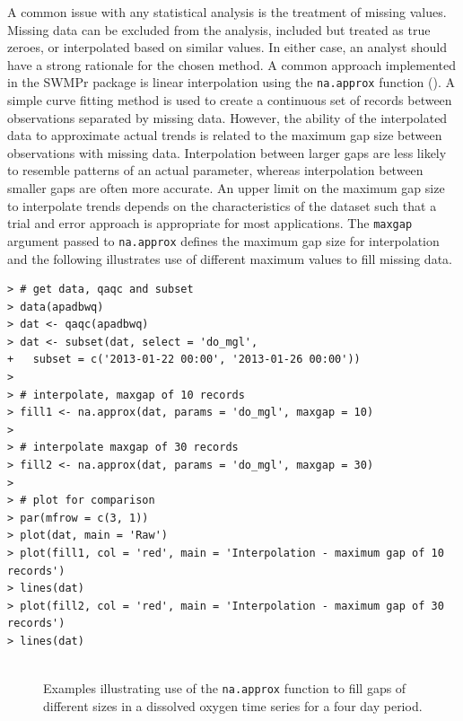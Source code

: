 \documentclass[10pt,letterpaper]{article}\usepackage[]{graphicx}\usepackage[]{color}
\makeatletter
\newenvironment{kframe}{%
 \def\at@end@of@kframe{}%
 \ifinner\ifhmode%
  \def\at@end@of@kframe{\end{minipage}}%
  \begin{minipage}{\columnwidth}%
 \fi\fi%
 \def\FrameCommand##1{\hskip\@totalleftmargin \hskip-\fboxsep
 \colorbox{shadecolor}{##1}\hskip-\fboxsep
     \hskip-\linewidth \hskip-\@totalleftmargin \hskip\columnwidth}%
 \MakeFramed {\advance\hsize-\width
   \@totalleftmargin\z@ \linewidth\hsize
   \@setminipage}}%
 {\par\unskip\endMakeFramed%
 \at@end@of@kframe}
\newenvironment{knitrout}{}{} %
\makeatother
\begin{document}
A common issue with any statistical analysis is the treatment of missing values.  Missing data can be excluded from the analysis, included but treated as true zeroes, or interpolated based on similar values.  In either case, an analyst should have a strong rationale for the chosen method.  A common approach implemented in the SWMPr package is linear interpolation using the \texttt{na.approx} function ().  A simple curve fitting method is used to create a continuous set of records between observations separated by missing data.  However, the ability of the interpolated data to approximate actual trends is related to the maximum gap size between observations with missing data.  Interpolation between larger gaps are less likely to resemble patterns of an actual parameter, whereas interpolation between smaller gaps are often more accurate.  An upper limit on the maximum gap size to interpolate trends depends on the characteristics of the dataset such that a trial and error approach is appropriate for most applications.  The \texttt{maxgap} argument passed to \texttt{na.approx} defines the maximum gap size for interpolation and the following illustrates use of different maximum values to fill missing data.  

\begin{knitrout}\small
{}\color{fgcolor}\begin{kframe}
\begin{verbatim}
> # get data, qaqc and subset
> data(apadbwq)
> dat <- qaqc(apadbwq)
> dat <- subset(dat, select = 'do_mgl', 
+   subset = c('2013-01-22 00:00', '2013-01-26 00:00'))
> 
> # interpolate, maxgap of 10 records
> fill1 <- na.approx(dat, params = 'do_mgl', maxgap = 10)
> 
> # interpolate maxgap of 30 records
> fill2 <- na.approx(dat, params = 'do_mgl', maxgap = 30)
> 
> # plot for comparison
> par(mfrow = c(3, 1))
> plot(dat, main = 'Raw')
> plot(fill1, col = 'red', main = 'Interpolation - maximum gap of 10 records')
> lines(dat)
> plot(fill2, col = 'red', main = 'Interpolation - maximum gap of 30 records')
> lines(dat)
\end{verbatim}
\end{kframe}\begin{figure}[!h]

{\centering \includegraphics[width=0.00\textwidth]{figure/interp_ex-1} 

}

\caption[Examples illustrating use of the \texttt{na.approx} function to fill gaps of different sizes in a dissolved oxygen time series for a four day period.]{Examples illustrating use of the \texttt{na.approx} function to fill gaps of different sizes in a dissolved oxygen time series for a four day period.}\label{fig:interp_ex}
\end{figure}


\end{knitrout}
\end{document}
